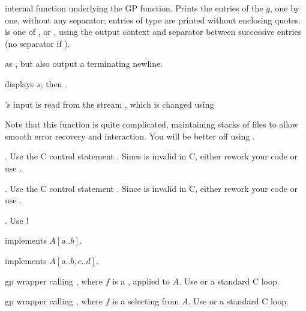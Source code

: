 
internal function underlying the
 GP function. Prints the entries of the  $g$, one by one,
without any separator; entries of type  are printed without enclosing
quotes. \fl is one of ,  or , using the
output context  and separator  between
successive entries (no separator if ).

 as
, but also output a terminating newline.

 displays $s$,
then .


's input is read from the stream , which is changed
using


Note that this function is quite complicated, maintaining stacks of files
to allow smooth error recovery and  interaction. You will be better
off using .


. Use the C control statement . Since
 is invalid in C, either rework your code or use .

. Use the C control statement . Since
 is invalid in C, either rework your code or use .

. Use !


 implements $A[a..b]$.

implements $A[a..b, c..d]$.


 gp wrapper calling , where $f$
is a , applied to $A$. Use  or a standard C loop.

 gp wrapper calling , where $f$
is a  selecting from $A$. Use  or a standard C loop.


